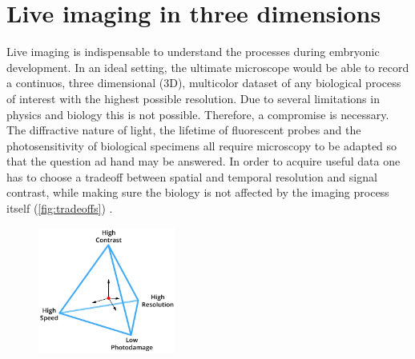 

\chapter{Live imaging in three dimensions}
\label{ch:intro}

\graphicspath{{./figures/1_spim/}}


Live imaging is indispensable to understand the processes during embryonic development. In an ideal setting, the ultimate microscope would be able to record a continuos, three dimensional (3D), multicolor dataset of any biological process of interest with the highest possible resolution. Due to several limitations in physics and biology this is not possible. Therefore, a compromise is necessary. The diffractive nature of light, the lifetime of fluorescent probes and the photosensitivity of biological specimens all require microscopy to be adapted so that the question ad hand may be answered. In order to acquire useful data one has to choose a tradeoff between spatial and temporal resolution and signal contrast, while making sure the biology is not affected by the imaging process itself (\autoref{fig:tradeoffs}) \cite{laissue_assessing_2017}.

\begin{figure}[bht]
  \centering
  \includegraphics[width=0.4\textwidth]{tradeoffs}
  \label{fig:tradeoffs}
\end{figure}



